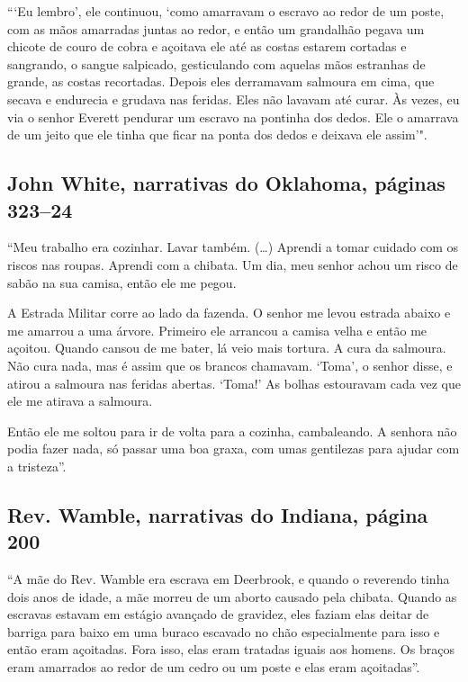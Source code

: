 ```Eu lembro', ele continuou, `como amarravam o escravo ao redor de um
poste, com as mãos amarradas juntas ao redor, e então um grandalhão
pegava um chicote de couro de cobra e açoitava ele até as costas estarem
cortadas e sangrando, o sangue salpicado, gesticulando com aquelas mãos
estranhas de grande, as costas recortadas. Depois eles derramavam
salmoura em cima, que secava e endurecia e grudava nas feridas. Eles não
lavavam até curar. Às vezes, eu via o senhor Everett pendurar um escravo
na pontinha dos dedos. Ele o amarrava de um jeito que ele tinha que
ficar na ponta dos dedos e deixava ele assim'".

\subsection{John White, narrativas do Oklahoma, páginas 323--24}
\label{ref283}

``Meu trabalho era cozinhar. Lavar também. (\ldots{}) Aprendi a tomar
cuidado com os riscos nas roupas. Aprendi com a chibata. Um dia, meu
senhor achou um risco de sabão na sua camisa, então ele me pegou.

A Estrada Militar corre ao lado da fazenda. O senhor me levou estrada
abaixo e me amarrou a uma árvore. Primeiro ele arrancou a camisa velha e
então me açoitou. Quando cansou de me bater, lá veio mais tortura. A
cura da salmoura. Não cura nada, mas é assim que os brancos chamavam.
`Toma', o senhor disse, e atirou a salmoura nas feridas abertas. `Toma!'
As bolhas estouravam cada vez que ele me atirava a salmoura.

Então ele me soltou para ir de volta para a cozinha, cambaleando. A
senhora não podia fazer nada, só passar uma boa graxa, com umas
gentilezas para ajudar com a tristeza''.

\subsection{Rev. Wamble, narrativas do Indiana, página 200}
\label{ref277}

``A mãe do Rev. Wamble era escrava em Deerbrook, e quando o reverendo
tinha dois anos de idade, a mãe morreu de um aborto causado pela
chibata. Quando as escravas estavam em estágio avançado de gravidez,
eles faziam elas deitar de barriga para baixo em uma buraco escavado no
chão especialmente para isso e então eram açoitadas. Fora isso, elas
eram tratadas iguais aos homens. Os braços eram amarrados ao redor de um
cedro ou um poste e elas eram açoitadas''.

